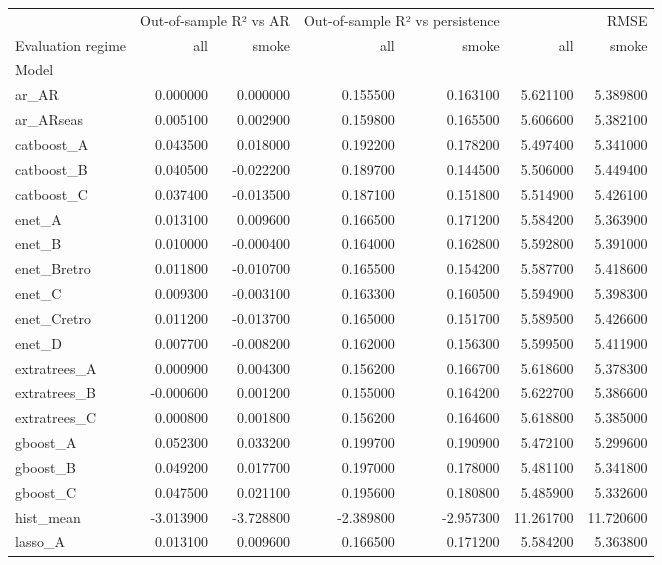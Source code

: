 \begin{tabular}{lrrrrrr}
\toprule
 & \multicolumn{2}{r}{Out-of-sample R² vs AR} & \multicolumn{2}{r}{Out-of-sample R² vs persistence} & \multicolumn{2}{r}{RMSE} \\
Evaluation regime & all & smoke & all & smoke & all & smoke \\
Model &  &  &  &  &  &  \\
\midrule
ar_AR & 0.000000 & 0.000000 & 0.155500 & 0.163100 & 5.621100 & 5.389800 \\
ar_ARseas & 0.005100 & 0.002900 & 0.159800 & 0.165500 & 5.606600 & 5.382100 \\
catboost_A & 0.043500 & 0.018000 & 0.192200 & 0.178200 & 5.497400 & 5.341000 \\
catboost_B & 0.040500 & -0.022200 & 0.189700 & 0.144500 & 5.506000 & 5.449400 \\
catboost_C & 0.037400 & -0.013500 & 0.187100 & 0.151800 & 5.514900 & 5.426100 \\
enet_A & 0.013100 & 0.009600 & 0.166500 & 0.171200 & 5.584200 & 5.363900 \\
enet_B & 0.010000 & -0.000400 & 0.164000 & 0.162800 & 5.592800 & 5.391000 \\
enet_Bretro & 0.011800 & -0.010700 & 0.165500 & 0.154200 & 5.587700 & 5.418600 \\
enet_C & 0.009300 & -0.003100 & 0.163300 & 0.160500 & 5.594900 & 5.398300 \\
enet_Cretro & 0.011200 & -0.013700 & 0.165000 & 0.151700 & 5.589500 & 5.426600 \\
enet_D & 0.007700 & -0.008200 & 0.162000 & 0.156300 & 5.599500 & 5.411900 \\
extratrees_A & 0.000900 & 0.004300 & 0.156200 & 0.166700 & 5.618600 & 5.378300 \\
extratrees_B & -0.000600 & 0.001200 & 0.155000 & 0.164200 & 5.622700 & 5.386600 \\
extratrees_C & 0.000800 & 0.001800 & 0.156200 & 0.164600 & 5.618800 & 5.385000 \\
gboost_A & 0.052300 & 0.033200 & 0.199700 & 0.190900 & 5.472100 & 5.299600 \\
gboost_B & 0.049200 & 0.017700 & 0.197000 & 0.178000 & 5.481100 & 5.341800 \\
gboost_C & 0.047500 & 0.021100 & 0.195600 & 0.180800 & 5.485900 & 5.332600 \\
hist_mean & -3.013900 & -3.728800 & -2.389800 & -2.957300 & 11.261700 & 11.720600 \\
lasso_A & 0.013100 & 0.009600 & 0.166500 & 0.171200 & 5.584200 & 5.363800 \\

\end{tabular}
